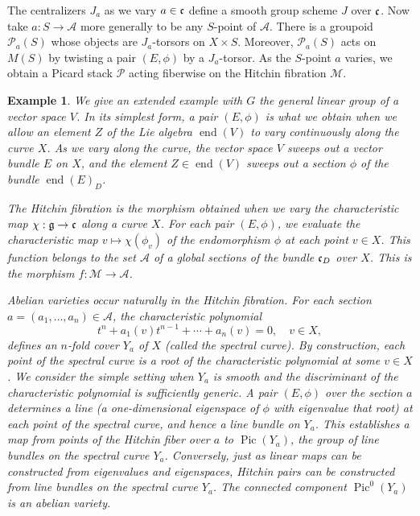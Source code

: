 \documentclass[brochure,english,12pt]{bourbaki}
\newtheorem{example}[equation]{Example}
\def\op#1{{\operatorname{#1}}}
\def\g{\frak{g}}
\def\cc{\frak{c}}
\def\A{{\mathcal A}}
\def\M{{\mathcal M}}
\def\P{{\mathcal P}}
\begin{document}
The centralizers $J_a$ as we vary $a\in \cc$ define a smooth group
scheme $J$ over $\cc$.  Now take  $a:S\to\A$  more generally to be any
$S$-point of $\A$.  There is a groupoid $\P_a(S)$ whose objects are
$J_a$-torsors on $X\times S$.  Moreover, $\P_a(S)$ acts on $M(S)$ by
twisting a pair $(E,\phi)$ by a $J_a$-torsor.  As the $S$-point $a$ varies, we
obtain a Picard stack $\P$ acting fiberwise on the Hitchin fibration
$\M$.

\begin{example}  We give an extended example with $G$ the general linear group of
a vector space $V$.
In its simplest form, a pair $(E,\phi)$
is what we obtain when we allow an element $Z$ of the Lie
algebra $\op{end}(V)$ to vary continuously along the curve $X$.  
As we vary along the curve, the vector space $V$ sweeps out a vector
bundle $E$ on $X$, and the element $Z\in\op{end}(V)$ sweeps out a
section $\phi$ of the bundle 
$\op{end}(E)_D$.

The {\it Hitchin fibration} is the morphism obtained when we vary the
characteristic map $\chi:\g\to \cc$  along a
curve $X$.  For each pair $(E,\phi)$, we evaluate the
characteristic map $v\mapsto \chi(\phi_v)$ of the endomorphism $\phi$
at each point $v\in X$. This function belongs to the set $\A$ of a
global sections of the bundle $\cc_D$ over $X$.  This is the morphism
$f:{\M}\to {\A}$.

{\it Abelian varieties} occur naturally in the Hitchin
fibration.  For each section $a=(a_1,\ldots,a_n)\in
\A$,  the characteristic
polynomial 
\begin{equation}\label{eqn:spectral}
t^n + a_1(v) t^{n-1} + \cdots+ a_n(v)=0,\quad v\in X,
\end{equation} 
defines an $n$-fold cover $Y_a$ of $X$ (called the {\it spectral
  curve}).  By construction, each point of the spectral curve is a
root of the characteristic polynomial at some $v\in X$.  We consider
the simple setting when $Y_a$ is smooth and the discriminant of the
characteristic polynomial is sufficiently generic.  A pair $(E,\phi)$ over
the section $a$ determines a line (a one-dimensional eigenspace of
$\phi$ with eigenvalue that root) at each point of the spectral curve,
and hence a line bundle on $Y_a$.  This establishes a map from points of the Hitchin fiber
 over $a$ to $\op{Pic}(Y_a)$, the group of line bundles on the
spectral curve $Y_a$.  Conversely, just as linear maps can be
constructed from eigenvalues and eigenspaces, Hitchin pairs can be
constructed from line bundles on the spectral curve $Y_a$.  The
connected component $\op{Pic}^0(Y_a)$ is an abelian variety.
\end{example}
\end{document}
